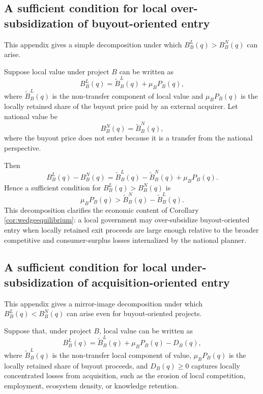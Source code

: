 \subsection{A sufficient condition for local over-subsidization of buyout-oriented entry}\label{app:sufficientlocalover}

This appendix gives a simple decomposition under which \(B_B^L(q)>B_B^N(q)\) can arise.

Suppose local value under project \(B\) can be written as
\begin{equation}
    B_B^L(q)
    =
    \widetilde B_B^L(q) + \mu_B P_B(q),
\end{equation}
where \(\widetilde B_B^L(q)\) is the non-transfer component of local value and \(\mu_B P_B(q)\) is the locally retained share of the buyout price paid by an external acquirer.
Let national value be
\begin{equation}
    B_B^N(q)=\widetilde B_B^N(q),
\end{equation}
where the buyout price does not enter because it is a transfer from the national perspective.

Then
\begin{equation}
    B_B^L(q)-B_B^N(q)
    =
    \widetilde B_B^L(q)-\widetilde B_B^N(q)+\mu_B P_B(q).
\end{equation}
Hence a sufficient condition for \(B_B^L(q)>B_B^N(q)\) is
\begin{equation}
    \mu_B P_B(q)
    >
    \widetilde B_B^N(q)-\widetilde B_B^L(q).
\end{equation}
This decomposition clarifies the economic content of Corollary \ref{cor:wedgeequilibrium}:
a local government may over-subsidize buyout-oriented entry when locally retained exit proceeds are large enough relative to the broader competitive and consumer-surplus losses internalized by the national planner.

\subsection{A sufficient condition for local under-subsidization of acquisition-oriented entry}\label{app:sufficientlocalunder}

This appendix gives a mirror-image decomposition under which
\(
B_B^L(q) < B_B^N(q)
\)
can arise even for buyout-oriented projects.

Suppose that, under project \(B\), local value can be written as
\begin{equation}\label{eq:BLunder}
    B_B^L(q)
    =
    \widetilde B_B^L(q)
    + \mu_B P_B(q)
    - D_B(q),
\end{equation}
where \(\widetilde B_B^L(q)\) is the non-transfer local component of value,
\(\mu_B P_B(q)\) is the locally retained share of buyout proceeds,
and \(D_B(q) \ge 0\) captures locally concentrated losses from acquisition, such as the erosion of local competition, employment, ecosystem density, or knowledge retention.

